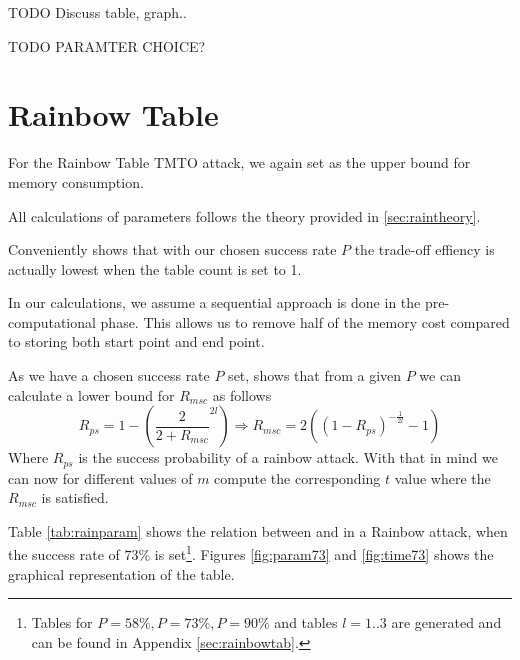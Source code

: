 TODO Discuss table, graph..

TODO PARAMTER CHOICE?

\section{Rainbow Table}
\label{sec:rainbowparam}
For the Rainbow Table TMTO attack, we again set  as the
upper bound for memory consumption.

All calculations of parameters follows the theory provided in
\ref{sec:raintheory}.

Conveniently \cite[Fig.4]{176} shows that with our chosen success rate
$P$ the trade-off effiency is actually lowest when the table count is
set to 1.

In our calculations, we assume a sequential approach is done in the
pre-computational phase. This allows us to remove half of the memory
cost compared to storing both start point and end point.

As we have a chosen success rate $P$ set, \cite[Proposition
29]{176} shows that from a given $P$ we can calculate a lower bound
for $R_{msc}$ as follows
\[R_{ps} = 1 - \left( \frac{2}{2 + R_{msc}}^{2l} \right) \Rightarrow R_{msc} = 2 ((1 - R_{ps})^{-\frac{1}{2l}} - 1)\]
Where $R_{ps}$ is the success probability of a rainbow attack. With
that in mind we can now for different values of $m$ compute the
corresponding $t$ value where the $R_{msc}$ is satisfied.

Table \ref{tab:rainparam} shows the relation between  and
 in a Rainbow attack, when the success rate of $73\%$ is set\footnote{Tables for $P = 58\%, P = 73\%, P = 90\%$ and tables $l=1..3$ are generated and can be
found in Appendix \ref{sec:rainbowtab}.}. Figures \ref{fig:param73}
and \ref{fig:time73} shows the graphical representation of the table.

